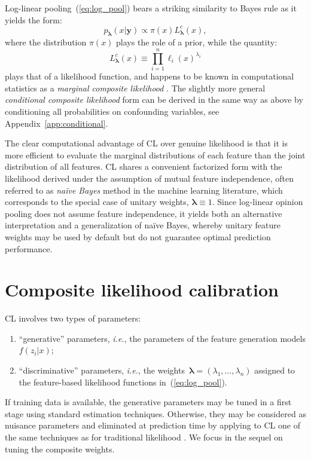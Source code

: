 \documentclass[english]{scrartcl}
\def\y{{\mathbf{y}}}
\newcommand{\blambda}{{\boldsymbol{\lambda}}}
\begin{document}
Log-linear pooling~(\ref{eq:log_pool}) bears a striking similarity to Bayes rule as it yields the form: 
$$
p_\blambda(x|\y)\propto \pi(x) L^c_\blambda(x),
$$
where the distribution $\pi(x)$ plays the role of a prior, while the quantity:
\begin{equation}
\label{eq:comp_lik}
L^c_\blambda(x) \equiv \prod_{i=1}^n \ell_i (x)^{\lambda_i}
\end{equation} 
plays that of a likelihood function, and happens to be known in computational statistics as a {\em marginal composite likelihood} \cite{Varin-11}. The slightly more general {\em conditional composite likelihood} form can be derived in the same way as above by conditioning all probabilities on confounding variables, see Appendix~\ref{app:conditional}. 

The clear computational advantage of CL over genuine likelihood is that it is more efficient to evaluate the marginal distributions of each feature than the joint distribution of all features. CL shares a convenient factorized form with the likelihood derived under the assumption of mutual feature independence, often referred to as {\em na\"ive Bayes} method in the machine learning literature, which corresponds to the special case of unitary weights, $\blambda\equiv 1$. Since log-linear opinion pooling does not assume feature independence, it yields both an alternative interpretation and a generalization of na\"ive Bayes, whereby unitary feature weights may be used by default but do not guarantee optimal prediction performance.


\section{Composite likelihood calibration}
\label{sec:calibration}

CL involves two types of parameters:
\begin{enumerate}
    \item ``generative'' parameters, {\em i.e.}, the parameters of the feature generation models $f(z_i|x)$; 
    \item ``discriminative'' parameters, {\em i.e.},  the weights~$\blambda=(\lambda_1,\ldots,\lambda_n)$ assigned to the feature-based likelihood functions in~(\ref{eq:log_pool}).
\end{enumerate}

If training data is available, the generative parameters may be tuned in a first stage using standard estimation techniques. Otherwise, they may be considered as nuisance parameters and eliminated at prediction time by applying to CL one of the same techniques as for traditional likelihood \cite{Berger-99}. We focus in the sequel on tuning the composite weights.
\end{document}
